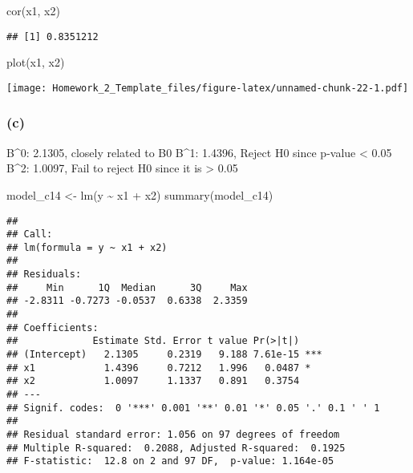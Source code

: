 \documentclass[
]{article}
\newenvironment{Shaded}{\begin{snugshade}}{\end{snugshade}}
\newcommand{\FunctionTok}[1]{\textcolor[rgb]{0.00,0.00,0.00}{#1}}
\newcommand{\NormalTok}[1]{#1}
\newcommand{\OtherTok}[1]{\textcolor[rgb]{0.56,0.35,0.01}{#1}}
\newcommand{\SpecialCharTok}[1]{\textcolor[rgb]{0.00,0.00,0.00}{#1}}
\begin{document}
\begin{Shaded}
\begin{Highlighting}[]
\FunctionTok{cor}\NormalTok{(x1, x2)}
\end{Highlighting}
\end{Shaded}

\begin{verbatim}
## [1] 0.8351212
\end{verbatim}

\begin{Shaded}
\begin{Highlighting}[]
\FunctionTok{plot}\NormalTok{(x1, x2)}
\end{Highlighting}
\end{Shaded}

\texttt{[image: Homework\_2\_Template\_files/figure-latex/unnamed-chunk-22-1.pdf]}

\hypertarget{c-3}{%
\subsubsection{(c)}\label{c-3}}

B\^{}0: 2.1305, closely related to B0 B\^{}1: 1.4396, Reject H0 since
p-value \textless{} 0.05 B\^{}2: 1.0097, Fail to reject H0 since it is
\textgreater{} 0.05

\begin{Shaded}
\begin{Highlighting}[]
\NormalTok{model\_c14 }\OtherTok{\textless{}{-}} \FunctionTok{lm}\NormalTok{(y }\SpecialCharTok{\textasciitilde{}}\NormalTok{ x1 }\SpecialCharTok{+}\NormalTok{ x2)}
\FunctionTok{summary}\NormalTok{(model\_c14)}
\end{Highlighting}
\end{Shaded}

\begin{verbatim}
## 
## Call:
## lm(formula = y ~ x1 + x2)
## 
## Residuals:
##     Min      1Q  Median      3Q     Max 
## -2.8311 -0.7273 -0.0537  0.6338  2.3359 
## 
## Coefficients:
##             Estimate Std. Error t value Pr(>|t|)    
## (Intercept)   2.1305     0.2319   9.188 7.61e-15 ***
## x1            1.4396     0.7212   1.996   0.0487 *  
## x2            1.0097     1.1337   0.891   0.3754    
## ---
## Signif. codes:  0 '***' 0.001 '**' 0.01 '*' 0.05 '.' 0.1 ' ' 1
## 
## Residual standard error: 1.056 on 97 degrees of freedom
## Multiple R-squared:  0.2088, Adjusted R-squared:  0.1925 
## F-statistic:  12.8 on 2 and 97 DF,  p-value: 1.164e-05
\end{verbatim}
\end{document}
